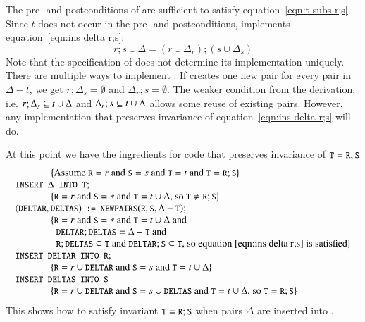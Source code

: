 \documentclass{elsarticle}
\begin{document}
	The pre- and postconditions of  are sufficient to satisfy equation~\ref{eqn:t subs r;s}.
	Since $t$ does not occur in the pre- and postconditions,  implements equation~\ref{eqn:ins delta r;s}:
\begin{equation}
r;s\cup\Delta=(r\cup \Delta_r);(s\cup \Delta_s)\label{eqn:ins delta r;s}
\end{equation}
	Note that the specification of  does not determine its implementation uniquely.
	There are multiple ways to implement .
	If  creates one new pair for every pair in $\Delta-t$,
	we get $r;\Delta_s=\emptyset$ and $\Delta_r;s=\emptyset$.
	The weaker condition from the derivation, i.e. $r;\Delta_s\subseteq t\cup\Delta$ and $\Delta_r;s\subseteq t\cup\Delta$ allows some reuse of existing pairs.
	However, any implementation that preserves invariance of equation~\ref{eqn:ins delta r;s} will do.

	At this point we have the ingredients for code that preserves invariance of $\text{\tt\small T}=\text{\tt\small R};\text{\tt\small S}$
\[\begin{array}{l}
\hspace{0.5in}\{\text{Assume }\code{R}=r\text{ and }\code{S}=s\text{ and }\code{T}=t\text{ and }\code{T}=\code{R};\code{S}\}\\
\code{INSERT }\Delta\code{ INTO T};\\
\hspace{0.5in}\{\code{R}=r\text{ and }\code{S}=s\text{ and }\code{T}=t\cup\Delta\text{, so }\code{T}\neq\code{R};\code{S}\}\\
(\code{DELTAR},\code{DELTAS})\code{ := }\code{NEWPAIRS}(\code{R}, \code{S}, \Delta-\code{T});\\
\hspace{0.5in}\{\code{R}=r\text{ and }\code{S}=s\text{ and }\code{T}=t\cup\Delta\text{ and }\\
\hspace{0.575in}\code{DELTAR};\code{DELTAS}=\Delta-\code{T}\text{ and }\\
\hspace{0.575in}\code{R};\code{DELTAS}\subs\code{T}\text{ and }\code{DELTAR};\code{S}\subs\code{T}\text{, so equation~\ref{eqn:ins delta r;s} is satisfied}\}\\
\code{INSERT DELTAR INTO R};\\
\hspace{0.5in}\{\code{R}=r\cup\code{DELTAR}\text{ and }\code{S}=s\text{ and }\code{T}=t\cup\Delta\}\\
\code{INSERT DELTAS INTO S}\\
\hspace{0.5in}\{\code{R}=r\cup\code{DELTAR}\text{ and }\code{S}=s\cup\code{DELTAS}\text{ and }\code{T}=t\cup\Delta\text{, so }\code{T}=\code{R};\code{S}\}
\end{array}\]
    This shows how to satisfy invariant $\text{\tt\small T}=\text{\tt\small R};\text{\tt\small S}$ when pairs $\Delta$ are inserted into .
\end{document}

